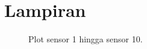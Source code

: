 


\pagebreak
\section*{Lampiran}

\begin{figure}
  
  \label{fig:plots_semua_sensor_test18}
  \caption{Plot sensor 1 hingga sensor 10.}
\end{figure}

